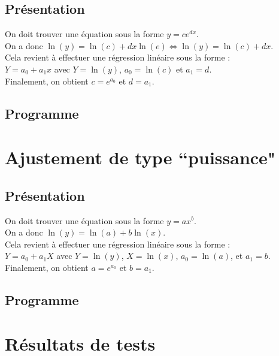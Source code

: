 \documentclass{report}
\begin{document}
      \subsection{Présentation}
	\noindent On doit trouver une équation sous la forme $y=c e^{dx}$.\\
	On a donc  $\ln (y)=\ln(c)+dx\ln(e)\Leftrightarrow \ln(y)=\ln(c)+dx$.\\
	Cela revient à effectuer une régression linéaire sous la forme :\\
	$Y=a_{0} + a_{1}x$ avec $Y=\ln(y)$, $a_{0}=\ln(c)$ et $a_{1}=d$.\\
	Finalement, on obtient $c=e^{a_0}$ et $d=a_1$.
      \subsection{Programme}
	
    \newpage
    \section{Ajustement de type ``puissance"}
      \subsection{Présentation}
	\noindent On doit trouver une équation sous la forme $y=a x^{b}$.\\
	On a donc $\ln(y)=\ln(a) + b\ln(x)$.\\
	Cela revient à effectuer une régression linéaire sous la forme : \\
	$Y=a_{0} + a_{1}X$ avec $Y=\ln(y)$, $X=\ln(x)$, $a_{0}=\ln(a)$, et $a_{1}=b$.\\
	Finalement, on obtient $a=e^{a_0}$ et $b=a_1$.
      \subsection{Programme}
	
    \newpage
    \section{Résultats de tests}
\end{document}
